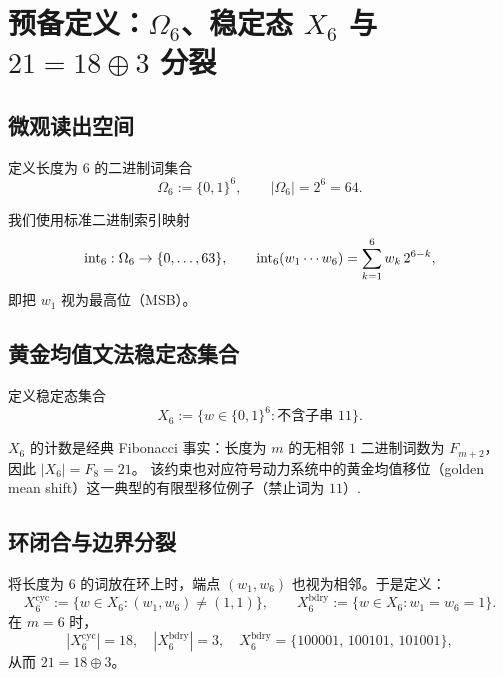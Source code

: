 
\section{预备定义：$\Omega_6$、稳定态 $X_6$ 与 $21=18\oplus 3$ 分裂}

\subsection{微观读出空间}

\begin{definition}[微观窗口态空间]
定义长度为 $6$ 的二进制词集合
$$
\Omega_6:=\{0,1\}^6,\qquad |\Omega_6|=2^6=64.
$$
\end{definition}

我们使用标准二进制索引映射
$$
\mathrm{int}_6:\Omega_6\to\{0,\dots,63\},\qquad
\mathrm{int}_6(w_1\cdots w_6)=\sum_{k=1}^6 w_k\,2^{6-k},
$$
即把 $w_1$ 视为最高位（MSB）。

\subsection{黄金均值文法稳定态集合}

\begin{definition}
定义稳定态集合
$$
X_6:=\{w\in\{0,1\}^6:\text{不含子串 }11\}.
$$
\end{definition}

$X_6$ 的计数是经典 Fibonacci 事实：长度为 $m$ 的无相邻 $1$ 二进制词数为 $F_{m+2}$，因此 $|X_6|=F_8=21$。
该约束也对应符号动力系统中的黄金均值移位（golden mean shift）这一典型的有限型移位例子（禁止词为 $11$）\cite{lind1995symbolic}.

\subsection{环闭合与边界分裂}

将长度为 $6$ 的词放在环上时，端点 $(w_1,w_6)$ 也视为相邻。于是定义：
$$
X_6^{\mathrm{cyc}}:=\{w\in X_6:(w_1,w_6)\neq(1,1)\},\qquad
X_6^{\mathrm{bdry}}:=\{w\in X_6:w_1=w_6=1\}.
$$
在 $m=6$ 时，
$$
|X_6^{\mathrm{cyc}}|=18,\quad |X_6^{\mathrm{bdry}}|=3,\quad
X_6^{\mathrm{bdry}}=\{100001,\,100101,\,101001\},
$$
从而 $21=18\oplus 3$。

